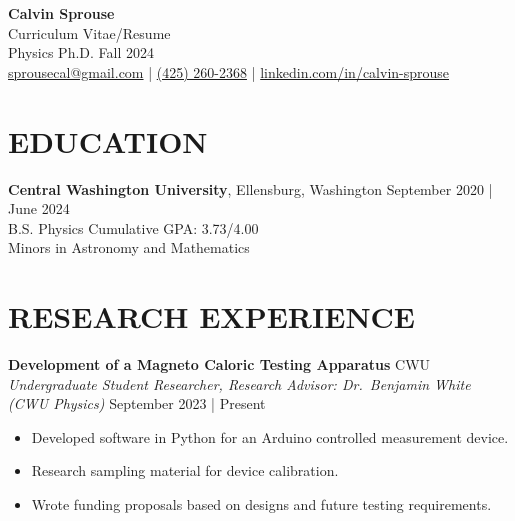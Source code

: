\documentclass[a4paper,9pt]{extarticle}
\begin{document}
\pagestyle{fancy}
\renewcommand{\headrulewidth}{0pt}
\fancyhead{}
\thispagestyle{empty}

\begin{flushleft}
\textbf{\LARGE Calvin Sprouse}\\[2pt]
Curriculum Vitae/Resume\\
Physics Ph.D. Fall 2024\\
\href{mailto:sprousecal@gmail.com}{sprousecal@gmail.com}
 | \href{tel:4252602368}{(425) 260-2368}
 | \href{https://www.linkedin.com/in/calvin-sprouse}{linkedin.com/in/calvin-sprouse}
\end{flushleft}




\section*{EDUCATION}
\noindent
\textbf{Central Washington University}, Ellensburg, Washington \hfill September 2020 | June 2024\\
B.S. Physics \hfill Cumulative GPA: 3.73/4.00 \\
Minors in Astronomy and Mathematics


\section*{RESEARCH EXPERIENCE}
\noindent\textbf{Development of a Magneto Caloric Testing Apparatus} \hfill CWU\\
\textit{Undergraduate Student Researcher, Research Advisor: Dr.\ Benjamin White (CWU Physics)} \hfill September 2023 | Present
\begin{itemize}
    \item Developed software in Python for an Arduino controlled measurement device.
    \item Research sampling material for device calibration.
    \item Wrote funding proposals based on designs and future testing requirements.
\end{itemize}
\end{document}
